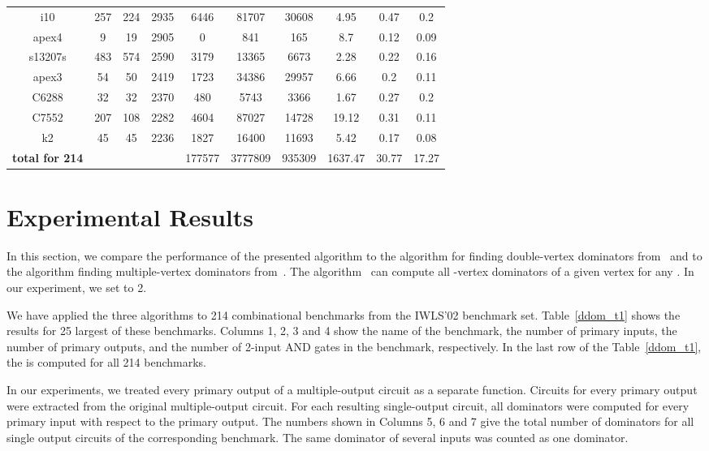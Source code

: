 \documentclass{llncs}
\begin{document}
\begin{table*}[t!]
\begin{tabular}{|@{}c@{}|c|c|c||c|c|c||c|c|c|}
i10	&	257	&	224	&	2935	&	6446	&	81707	&	30608	&	4.95	&	 0.47	 &	 0.2	 \\
apex4	&	9	&	19	&	2905	&	0	&	841	&	165	&	8.7	&	0.12	&	 0.09	 \\
s13207s	&	483	&	574	&	2590	&	3179	&	13365	&	6673	&	2.28	 &	 0.22	 &	 0.16	\\
apex3	&	54	&	50	&	2419	&	1723	&	34386	&	29957	&	6.66	 &	 0.2	 &	 0.11	\\
C6288	&	32	&	32	&	2370	&	480	&	5743	&	3366	&	1.67	&	 0.27	 &	 0.2	 \\
C7552	&	207	&	108	&	2282	&	4604	&	87027	&	14728	&	19.12	 &	 0.31	 &	 0.11	\\
k2	&	45	&	45	&	2236	&	1827	&	16400	&	11693	&	5.42	&	 0.17	 &	 0.08	\\ \hline
{\bf total for 214}	&		&		&		& 177577	& 3777809	&	935309	&	1637.47	 &	 30.77  &  17.27 \\ \hline
\end{tabular}
\vspace*{1mm}
\caption{Benchmark results for IWLS'02 benchmark set.} \label{ddom_t1}
\end{table*}


\section{Experimental Results} \label{ddom_exp}

In this section, we compare the performance of the presented algorithm
to the algorithm for finding double-vertex dominators from~\cite{TeD05b}
and to the algorithm finding multiple-vertex dominators
from~\cite{DuTM04}.  
The algorithm~\cite{DuTM04} can compute
all -vertex dominators of a given vertex for any . In our experiment, 
we set  to 2.

We have applied the three algorithms to 214 combinational benchmarks 
from the IWLS'02 benchmark set.
Table~\ref{ddom_t1} shows the results for 25 largest of these benchmarks. 
Columns 1, 2, 3 and 4 show the name of the benchmark, the number of
primary inputs, the number of primary outputs, and the number of 2-input AND gates in the benchmark,
respectively. 
In the last row of the Table~\ref{ddom_t1}, the  is
computed for all 214 benchmarks.

In our experiments, we treated every primary output of a multiple-output
circuit as a separate function. Circuits for every primary output were extracted
from the original multiple-output circuit. For each resulting
single-output circuit, all dominators were computed for every primary
input with respect to the primary output. The numbers shown in Columns 5, 6
and 7 give the total number of dominators for all single
output circuits of the corresponding benchmark. 
The same dominator of several inputs was counted as one dominator.
\end{document}
